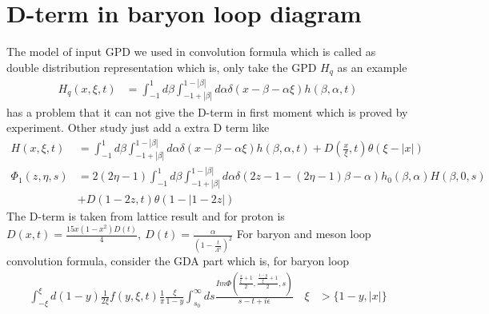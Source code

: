 \documentclass[preprintnumbers,prd,superscriptaddress,preprint]{revtex4-1}
\begin{document}
	
	\section{D-term in baryon loop diagram}
	The model of input GPD we used in convolution formula which is called as double distribution representation which is, only take the GPD $H_{q}$ as an example 
	\begin{align*}
		H_{q}(x,\xi,t) & =\int_{-1}^{1}d\beta\int_{-1+|\beta|}^{1-|\beta|}d\alpha\delta(x-\beta-\alpha\xi)h(\beta,\alpha,t)
	\end{align*}
	has a problem that it can not give the D-term in first moment which is proved by experiment. Other study just add a extra D term like
	\begin{align*}
		H(x,\xi,t) & =\int_{-1}^{1}d\beta\int_{-1+|\beta|}^{1-|\beta|}d\alpha\delta(x-\beta-\alpha\xi)h(\beta,\alpha,t)+D(\frac{x}{\xi},t)\theta(\xi-|x|)\\
		\Phi_{1}(z,\eta,s) & =2(2\eta-1)\int_{-1}^{1}d\beta\int_{-1+|\beta|}^{1-|\beta|}d\alpha\delta(2z-1-(2\eta-1)\beta-\alpha)h_{0}(\beta,\alpha)H(\beta,0,s)\\
		& +D(1-2z,t)\theta(1-|1-2z|)
	\end{align*}
	The D-term is taken from lattice result and for proton is $D(x,t)=\frac{15x(1-x^{2})D(t)}{4},\ D(t)=\frac{\alpha}{(1-\frac{t}{\Lambda^{2}})^{2}}$
	For baryon and meson loop convolution formula, consider the GDA part which is, for baryon loop 
	\begin{align*}
		\int_{-\xi}^{\xi}d(1-y)\frac{1}{2\xi}f(y,\xi,t)\frac{1}{\pi}\frac{\xi}{1-y}\int_{s_{0}}^{\infty}ds\frac{Im\Phi(\frac{\frac{x}{\xi}+1}{2},\frac{\frac{1-y}{\xi}+1}{2},s)}{s-t+i\epsilon}\quad\xi & >\{1-y,|x|\}
	\end{align*}
	
\end{document}
